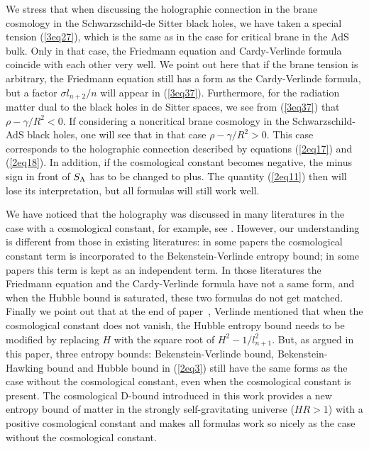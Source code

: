 \documentclass[a4paper,12pt]{article}
\begin{document}
We stress that when discussing the holographic connection in the brane cosmology 
in the Schwarzschild-de Sitter black holes, we have taken a special 
tension (\ref{3eq27}), which is the same as in the case for critical brane 
in the AdS bulk. Only in that case, the Friedmann equation and Cardy-Verlinde
formula coincide with each other very well. We point out here that if the brane 
tension is arbitrary, the Friedmann equation still has a  form as the
Cardy-Verlinde formula,  but a factor $\sigma l_{n+2}/n$ will
appear in (\ref{3eq37}). Furthermore, for the radiation matter dual to the black holes
in de Sitter spaces, we see from (\ref{3eq37}) that $\rho - \gamma/R^2 <0$. If 
 considering a noncritical brane cosmology in the Schwarzschild-AdS black holes,  
 one will see that in that case $\rho-\gamma/R^2>0$. This case corresponds to the 
holographic connection described by equations (\ref{2eq17}) and (\ref{2eq18}).
In addition, if the cosmological constant becomes negative, the minus sign in front of
$S_{\rm \Lambda}$ has to be changed to plus. The quantity (\ref{2eq11})
then will lose its interpretation, but all formulas will still work well.


We have noticed that the holography was discussed in many  literatures in the
case with a cosmological constant, for example, 
see \cite{Ogush,deSitter,Padi,Wang,Nojiri,Youm,Medved}. However, our understanding
is different from those in existing literatures: in some papers the cosmological
constant term is incorporated to the Bekenstein-Verlinde entropy bound; in some
papers this term is kept as an independent term. In those literatures the Friedmann
equation and the Cardy-Verlinde formula have not a same form, and when the Hubble 
bound is saturated, these two formulas do not get matched.  Finally we point out
that at the end of paper~\cite{Verl}, Verlinde mentioned that when the cosmological constant
does not vanish, the Hubble entropy bound needs to be modified by replacing $H$ with
the square root of $H^2-1/l_{n+1}^2$. But, as argued in this paper, three entropy 
bounds: Bekenstein-Verlinde bound, Bekenstein-Hawking bound and Hubble bound 
in (\ref{2eq3}) still have the same forms as the case without the cosmological constant,
even when the cosmological constant is present. The cosmological D-bound introduced
in this work provides a new entropy bound of matter in the strongly self-gravitating 
universe ($HR>1$) with a positive cosmological constant and makes all formulas work so 
nicely as the case without the cosmological constant.
\end{document}
